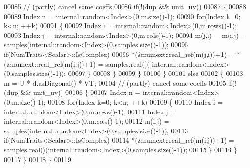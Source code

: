 \begin{DoxyCode}
00085       \textcolor{comment}{// (partly) cancel some coeffs}
00086       \textcolor{keywordflow}{if}(!(dup && unit\_uv))
00087       \{
00088         
00089         Index n = internal::random<Index>(0,m.size()-1);
00090         \textcolor{keywordflow}{for}(Index k=0; k<n; ++k)
00091         \{
00092           Index i = internal::random<Index>(0,m.rows()-1);
00093           Index j = internal::random<Index>(0,m.cols()-1);
00094           m(j,i) = m(i,j) = samples(internal::random<Index>(0,samples.size()-1));
00095           \textcolor{keywordflow}{if}(NumTraits<Scalar>::IsComplex)
00096             *(&numext::real\_ref(m(j,i))+1) = *(&numext::real\_ref(m(i,j))+1) = samples.real()(
      internal::random<Index>(0,samples.size()-1));
00097         \}
00098       \}
00099     \}
00100   \}
00101   \textcolor{keywordflow}{else}
00102   \{
00103     m = U * d.asDiagonal() * VT;
00104     \textcolor{comment}{// (partly) cancel some coeffs}
00105     \textcolor{keywordflow}{if}(!(dup && unit\_uv))
00106     \{
00107       Index n = internal::random<Index>(0,m.size()-1);
00108       \textcolor{keywordflow}{for}(Index k=0; k<n; ++k)
00109       \{
00110         Index i = internal::random<Index>(0,m.rows()-1);
00111         Index j = internal::random<Index>(0,m.cols()-1);
00112         m(i,j) = samples(internal::random<Index>(0,samples.size()-1));
00113         \textcolor{keywordflow}{if}(NumTraits<Scalar>::IsComplex)
00114           *(&numext::real\_ref(m(i,j))+1) = samples.real()(internal::random<Index>(0,samples.size()-1));
00115       \}
00116     \}
00117   \}
00118 \}
00119 
\end{DoxyCode}
